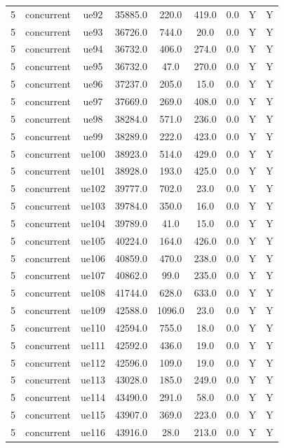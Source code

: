 \begin{table}[ht]
\begin{tabular}{|c|c|c|c|c|c|c|c|c|}
5 & concurrent & ue92 & 35885.0 & 220.0 & 419.0 & 0.0 & Y & Y \\
5 & concurrent & ue93 & 36726.0 & 744.0 & 20.0 & 0.0 & Y & Y \\
5 & concurrent & ue94 & 36732.0 & 406.0 & 274.0 & 0.0 & Y & Y \\
5 & concurrent & ue95 & 36732.0 & 47.0 & 270.0 & 0.0 & Y & Y \\
5 & concurrent & ue96 & 37237.0 & 205.0 & 15.0 & 0.0 & Y & Y \\
5 & concurrent & ue97 & 37669.0 & 269.0 & 408.0 & 0.0 & Y & Y \\
5 & concurrent & ue98 & 38284.0 & 571.0 & 236.0 & 0.0 & Y & Y \\
5 & concurrent & ue99 & 38289.0 & 222.0 & 423.0 & 0.0 & Y & Y \\
5 & concurrent & ue100 & 38923.0 & 514.0 & 429.0 & 0.0 & Y & Y \\
5 & concurrent & ue101 & 38928.0 & 193.0 & 425.0 & 0.0 & Y & Y \\
5 & concurrent & ue102 & 39777.0 & 702.0 & 23.0 & 0.0 & Y & Y \\
5 & concurrent & ue103 & 39784.0 & 350.0 & 16.0 & 0.0 & Y & Y \\
5 & concurrent & ue104 & 39789.0 & 41.0 & 15.0 & 0.0 & Y & Y \\
5 & concurrent & ue105 & 40224.0 & 164.0 & 426.0 & 0.0 & Y & Y \\
5 & concurrent & ue106 & 40859.0 & 470.0 & 238.0 & 0.0 & Y & Y \\
5 & concurrent & ue107 & 40862.0 & 99.0 & 235.0 & 0.0 & Y & Y \\
5 & concurrent & ue108 & 41744.0 & 628.0 & 633.0 & 0.0 & Y & Y \\
5 & concurrent & ue109 & 42588.0 & 1096.0 & 23.0 & 0.0 & Y & Y \\
5 & concurrent & ue110 & 42594.0 & 755.0 & 18.0 & 0.0 & Y & Y \\
5 & concurrent & ue111 & 42592.0 & 436.0 & 19.0 & 0.0 & Y & Y \\
5 & concurrent & ue112 & 42596.0 & 109.0 & 19.0 & 0.0 & Y & Y \\
5 & concurrent & ue113 & 43028.0 & 185.0 & 249.0 & 0.0 & Y & Y \\
5 & concurrent & ue114 & 43490.0 & 291.0 & 58.0 & 0.0 & Y & Y \\
5 & concurrent & ue115 & 43907.0 & 369.0 & 223.0 & 0.0 & Y & Y \\
5 & concurrent & ue116 & 43916.0 & 28.0 & 213.0 & 0.0 & Y & Y \\

\end{tabular}
\end{table}

